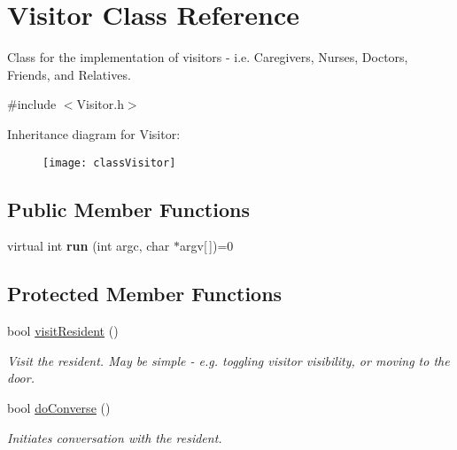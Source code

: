 \hypertarget{classVisitor}{\section{Visitor Class Reference}
\label{classVisitor}
}


Class for the implementation of visitors -\/ i.\-e. Caregivers, Nurses, Doctors, Friends, and Relatives.  




{\ttfamily \#include $<$Visitor.\-h$>$}

Inheritance diagram for Visitor\-:\begin{figure}[H]
\begin{center}
\leavevmode
\texttt{[image: classVisitor]}
\end{center}
\end{figure}
\subsection*{Public Member Functions}
\begin{DoxyCompactItemize}
\item 
\hypertarget{classVisitor_a39bbfe26aece491b11f47a2d1baca377}{virtual int {\bfseries run} (int argc, char $\ast$argv\mbox{[}$\,$\mbox{]})=0}\label{classVisitor_a39bbfe26aece491b11f47a2d1baca377}

\end{DoxyCompactItemize}
\subsection*{Protected Member Functions}
\begin{DoxyCompactItemize}
\item 
bool \hyperlink{classVisitor_ad32450b21924b7d581b99c9e1c20c829}{visit\-Resident} ()
\begin{DoxyCompactList}\small\item\em Visit the resident. May be simple -\/ e.\-g. toggling visitor visibility, or moving to the door. \end{DoxyCompactList}\item 
bool \hyperlink{classVisitor_a0dc0a203978b84f73a887d1f1de54225}{do\-Converse} ()
\begin{DoxyCompactList}\small\item\em Initiates conversation with the resident. \end{DoxyCompactList}\end{DoxyCompactItemize}

